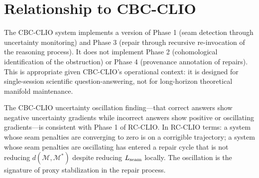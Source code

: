 \section{Relationship to CBC-CLIO}

The CBC-CLIO system implements a version of Phase 1 (seam detection through
uncertainty monitoring) and Phase 3 (repair through recursive re-invocation
of the reasoning process). It does not implement Phase 2 (cohomological
identification of the obstruction) or Phase 4 (provenance annotation of
repairs). This is appropriate given CBC-CLIO's operational context: it is
designed for single-session scientific question-answering, not for long-horizon
theoretical manifold maintenance.

\claimC The CBC-CLIO uncertainty oscillation finding---that correct answers
show negative uncertainty gradients while incorrect answers show positive or
oscillating gradients---is consistent with Phase 1 of RC-CLIO. In RC-CLIO
terms: a system whose seam penalties are converging to zero is on a corrigible
trajectory; a system whose seam penalties are oscillating has entered a repair
cycle that is not reducing $d(\mathcal{M}, \mathcal{M}^*)$ despite reducing
$L_{\rm seam}$ locally. The oscillation is the signature of proxy stabilization
in the repair process.
